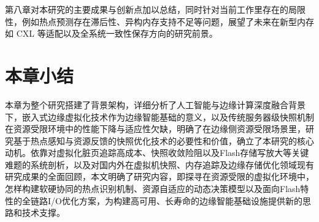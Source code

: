 第八章对本研究的主要成果与创新点加以总结，同时针对当前工作里存在的局限性，例如热点预测存在滞后性、异构内存支持不足等问题，展望了未来在新型内存如 CXL 等适配以及全系统一致性保存方向的研究前景。

\section{本章小结}

本章为整个研究搭建了背景架构，详细分析了人工智能与边缘计算深度融合背景下，嵌入式边缘虚拟化技术作为边缘智能基础的意义，以及传统服务器级快照机制在资源受限环境中的性能下降与适应性欠缺，明确了在边缘侧资源受限场景里，研究基于热点感知与资源反馈的快照优化技术的必要性和价值，确立了本研究的核心动机。依靠对虚拟化脏页追踪高成本、快照收敛险阻以及Flash存储写放大等关键难题的系统剖析，以及对国内外在虚拟机快照、内存追踪及边缘存储优化领域现有研究成果的全面回顾，本文明确了研究内容，即探寻在资源受限的虚拟化环境中，怎样构建软硬协同的热点识别机制、资源自适应的动态决策模型以及面向Flash特性的全链路I/O优化方案，为构建高可用、长寿命的边缘智能基础设施提供新的思路和技术支撑。

